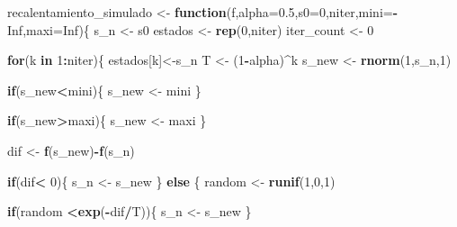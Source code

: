 \documentclass[
]{article}
\newenvironment{Shaded}{\begin{snugshade}}{\end{snugshade}}
\newcommand{\AttributeTok}[1]{\textcolor[rgb]{0.13,0.29,0.53}{#1}}
\newcommand{\ConstantTok}[1]{\textcolor[rgb]{0.56,0.35,0.01}{#1}}
\newcommand{\ControlFlowTok}[1]{\textcolor[rgb]{0.13,0.29,0.53}{\textbf{#1}}}
\newcommand{\DecValTok}[1]{\textcolor[rgb]{0.00,0.00,0.81}{#1}}
\newcommand{\FloatTok}[1]{\textcolor[rgb]{0.00,0.00,0.81}{#1}}
\newcommand{\FunctionTok}[1]{\textcolor[rgb]{0.13,0.29,0.53}{\textbf{#1}}}
\newcommand{\NormalTok}[1]{#1}
\newcommand{\OtherTok}[1]{\textcolor[rgb]{0.56,0.35,0.01}{#1}}
\newcommand{\SpecialCharTok}[1]{\textcolor[rgb]{0.81,0.36,0.00}{\textbf{#1}}}
\begin{document}
\begin{Shaded}
\begin{Highlighting}[]
\NormalTok{recalentamiento\_simulado }\OtherTok{\textless{}{-}} \ControlFlowTok{function}\NormalTok{(f,}\AttributeTok{alpha=}\FloatTok{0.5}\NormalTok{,}\AttributeTok{s0=}\DecValTok{0}\NormalTok{,niter,}\AttributeTok{mini=}\SpecialCharTok{{-}}\ConstantTok{Inf}\NormalTok{,}\AttributeTok{maxi=}\ConstantTok{Inf}\NormalTok{)\{ }
\NormalTok{  s\_n }\OtherTok{\textless{}{-}}\NormalTok{ s0 }
\NormalTok{  estados }\OtherTok{\textless{}{-}} \FunctionTok{rep}\NormalTok{(}\DecValTok{0}\NormalTok{,niter) }
\NormalTok{  iter\_count }\OtherTok{\textless{}{-}} \DecValTok{0} 
  
  \ControlFlowTok{for}\NormalTok{(k }\ControlFlowTok{in} \DecValTok{1}\SpecialCharTok{:}\NormalTok{niter)\{ }
\NormalTok{    estados[k]}\OtherTok{\textless{}{-}}\NormalTok{s\_n }
\NormalTok{    T }\OtherTok{\textless{}{-}}\NormalTok{ (}\DecValTok{1}\SpecialCharTok{{-}}\NormalTok{alpha)}\SpecialCharTok{\^{}}\NormalTok{k}
\NormalTok{    s\_new }\OtherTok{\textless{}{-}} \FunctionTok{rnorm}\NormalTok{(}\DecValTok{1}\NormalTok{,s\_n,}\DecValTok{1}\NormalTok{)}
    
    \ControlFlowTok{if}\NormalTok{(s\_new}\SpecialCharTok{\textless{}}\NormalTok{mini)\{}
\NormalTok{      s\_new }\OtherTok{\textless{}{-}}\NormalTok{ mini}
\NormalTok{    \} }
    
    \ControlFlowTok{if}\NormalTok{(s\_new}\SpecialCharTok{\textgreater{}}\NormalTok{maxi)\{}
\NormalTok{      s\_new }\OtherTok{\textless{}{-}}\NormalTok{ maxi}
\NormalTok{    \} }
    
\NormalTok{    dif }\OtherTok{\textless{}{-}} \FunctionTok{f}\NormalTok{(s\_new)}\SpecialCharTok{{-}}\FunctionTok{f}\NormalTok{(s\_n)}
    
    \ControlFlowTok{if}\NormalTok{(dif}\SpecialCharTok{\textless{}} \DecValTok{0}\NormalTok{)\{ }
\NormalTok{      s\_n }\OtherTok{\textless{}{-}}\NormalTok{ s\_new }
\NormalTok{    \} }\ControlFlowTok{else}\NormalTok{ \{ }
\NormalTok{        random }\OtherTok{\textless{}{-}} \FunctionTok{runif}\NormalTok{(}\DecValTok{1}\NormalTok{,}\DecValTok{0}\NormalTok{,}\DecValTok{1}\NormalTok{) }
        
        \ControlFlowTok{if}\NormalTok{(random }\SpecialCharTok{\textless{}}\FunctionTok{exp}\NormalTok{(}\SpecialCharTok{{-}}\NormalTok{dif}\SpecialCharTok{/}\NormalTok{T))\{ }
\NormalTok{          s\_n }\OtherTok{\textless{}{-}}\NormalTok{ s\_new }
\NormalTok{        \} }
        

\end{Highlighting}
\end{Shaded}
\end{document}
